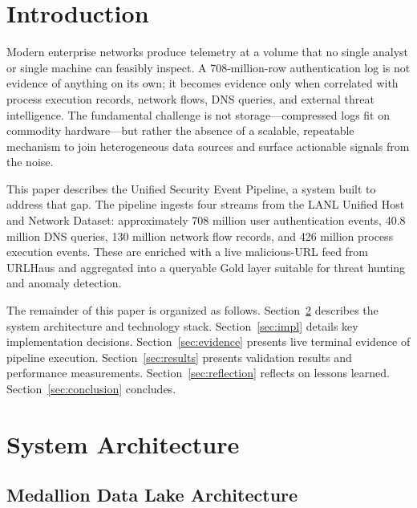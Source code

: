 \documentclass[conference]{IEEEtran}
\begin{document}
\section{Introduction}

Modern enterprise networks produce telemetry at a volume that no single analyst or single machine can feasibly inspect. A 708-million-row authentication log is not evidence of anything on its own; it becomes evidence only when correlated with process execution records, network flows, DNS queries, and external threat intelligence. The fundamental challenge is not storage---compressed logs fit on commodity hardware---but rather the absence of a scalable, repeatable mechanism to join heterogeneous data sources and surface actionable signals from the noise.

This paper describes the Unified Security Event Pipeline, a system built to address that gap. The pipeline ingests four streams from the LANL Unified Host and Network Dataset: approximately 708 million user authentication events, 40.8 million DNS queries, 130 million network flow records, and 426 million process execution events. These are enriched with a live malicious-URL feed from URLHaus and aggregated into a queryable Gold layer suitable for threat hunting and anomaly detection.

The remainder of this paper is organized as follows. Section~\ref{sec:arch} describes the system architecture and technology stack. Section~\ref{sec:impl} details key implementation decisions. Section~\ref{sec:evidence} presents live terminal evidence of pipeline execution. Section~\ref{sec:results} presents validation results and performance measurements. Section~\ref{sec:reflection} reflects on lessons learned. Section~\ref{sec:conclusion} concludes.

\section{System Architecture}
\label{sec:arch}

\subsection{Medallion Data Lake Architecture}
\end{document}

